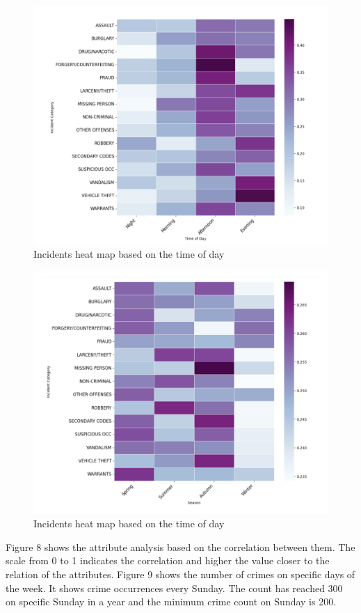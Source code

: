 \documentclass[conference,final,]{IEEEtran}
\begin{document}
\begin{figure}

{\centering \includegraphics[width=0.7\linewidth]{img/fig6} 

}

\caption{Incidents heat map based on the time of day}\label{fig:unnamed-chunk-6}
\end{figure}

\begin{figure}

{\centering \includegraphics[width=0.7\linewidth]{img/fig7} 

}

\caption{Incidents heat map based on the time of day}\label{fig:unnamed-chunk-7}
\end{figure}

Figure 8 shows the attribute analysis based on the correlation between
them. The scale from 0 to 1 indicates the correlation and higher the
value closer to the relation of the attributes. Figure 9 shows the
number of crimes on specific days of the week. It shows crime
occurrences every Sunday. The count has reached 300 on specific Sunday
in a year and the minimum crime count on Sunday is 200.
\end{document}
